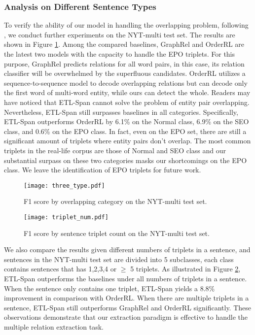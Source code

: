\documentclass{ecai}
\begin{document}
\subsubsection{Analysis on Different Sentence Types }
To verify the ability of our model in handling the overlapping problem, following \cite{fu-etal-2019-graphrel,zeng2018extracting}, we conduct further experiments on the NYT-multi test set.
The results are shown in Figure \ref{fig:overlap}.
Among the compared baselines, GraphRel and OrderRL are the latest two models with the capacity to handle the EPO triplets. For this purpose, GraphRel predicts relations for all word pairs, in this case, its relation classifier will be overwhelmed by the superfluous candidates. 
OrderRL utilizes a sequence-to-sequence model to decode overlapping relations but can decode only the first word of multi-word entity, while ours can detect the whole.
Readers may have noticed that ETL-Span cannot solve the problem of entity pair overlapping. 
Nevertheless, ETL-Span still surpasses baselines in all categories. 
Specifically, ETL-Span outperforms OrderRL by 6.1\% on the Normal class, 6.9\% on the SEO class, and 0.6\% on the EPO class.
In fact, even on the EPO set, there are still a significant amount of triplets where entity pairs don't overlap.
The most common triplets in the real-life corpus are those of Normal and SEO class and our substantial surpass on these two categories masks our shortcomings on the EPO class. We leave the identification of EPO triplets for future work.
 

\begin{figure}[t]
    \centering
    \texttt{[image: three\_type.pdf]}
    \caption{ F1 score by overlapping category on the NYT-multi test set.} 
     \label{fig:overlap}
\end{figure}

\begin{figure}[t]
    \centering
    \texttt{[image: triplet\_num.pdf]}
    \caption{F1 score by sentence triplet count on the NYT-multi test set.} 
     \label{fig:tripcnt}
\end{figure}


We also compare the results given different numbers of triplets in a sentence, and sentences in the NYT-multi test set are divided into 5 subclasses, each class contains sentences that has 1,2,3,4 or $\geq$ 5 triplets. 
As illustrated in Figure \ref{fig:tripcnt}, ETL-Span outperforms the baselines under all numbers of triplets in a sentence.
When the sentence only contains one triplet, ETL-Span yields a 8.8\% improvement in comparison with OrderRL.
When there are multiple triplets in a sentence, ETL-Span still outperforms GraphRel and OrderRL significantly.
These observations demonstrate that our extraction paradigm is effective to handle the multiple relation extraction task.
\end{document}
